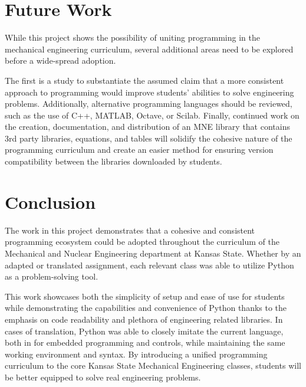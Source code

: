 \section{Future Work}

While this project shows the possibility of uniting programming in the mechanical 
engineering curriculum, several additional areas need to be explored before a 
wide-spread adoption. 

The first is a study to substantiate the assumed claim that a more 
consistent approach to programming would improve students' abilities to solve
engineering problems. Additionally, alternative programming languages should be
reviewed, such as the use of C++, MATLAB, Octave, or Scilab. 
Finally, continued work on the creation, documentation, and distribution
of an MNE library that contains 3rd party libraries, equations, and tables
will solidify the cohesive nature of the programming curriculum and create an
easier method for ensuring version compatibility between the libraries downloaded 
by students.

\section{Conclusion}

The work in this project demonstrates that a cohesive and consistent programming 
ecosystem could be adopted throughout the curriculum of the Mechanical and 
Nuclear Engineering department at Kansas State. Whether by an adapted or translated
assignment, each relevant class was able to utilize Python as a problem-solving 
tool. 

This work showcases both the simplicity of setup and ease of use for students
while demonstrating the capabilities and convenience of Python thanks to the 
emphasis on code readability and plethora of engineering related libraries.
In cases of translation, Python was able to closely imitate the current language,
both in for embedded programming and controls, while maintaining the same 
working environment and syntax. By introducing a unified programming curriculum
to the core Kansas State Mechanical Engineering classes, students will be better
equipped to solve real engineering problems.
